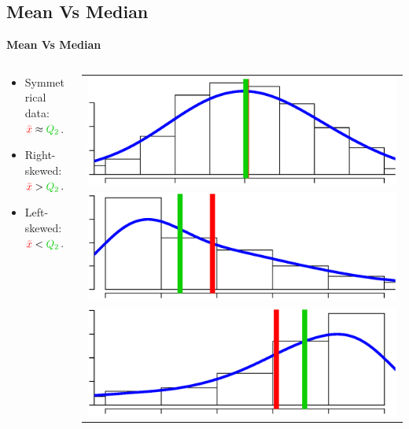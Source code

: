 \documentclass[compress]{beamer}        %
\makeatletter
\newcommand{\tcb}{\textcolor{beamer@blendedblue}}
\newcommand{\tcr}{\textcolor{red}}
\newcommand{\tcRg}{\textcolor{Rgreen}}
\makeatother
\begin{document}
\subsection{Mean Vs Median}
\begin{frame}{\bf \tcb{Mean Vs Median}\\[-1.3cm]}
\begin{columns}

\begin{column}{.5\textwidth}
\begin{adjustwidth}{-0.1cm}{0.0cm}
\begin{itemize}\itemsep2.3cm
\item Symmetrical data: $\tcr{\bar x} \approx \tcRg{Q_2}$.
\item Right-skewed: $\tcr{\bar x} > \tcRg{Q_2}$.
\item Left-skewed: $\tcr{\bar x} < \tcRg{Q_2}$.
\end{itemize}
\end{adjustwidth}
\end{column}

\begin{column}{.5\textwidth}
\begin{adjustwidth}{-0.3cm}{0.0cm}

\begin{tabular}{c}
\includegraphics[width=1\textwidth, trim = 0.0cm 0.5cm 0.3cm 1.5cm, clip]{Symmetrical2}\\
\includegraphics[width=1\textwidth, trim = 0.0cm 0.5cm 0.3cm 1.5cm, clip]{SkewRight2}\\
\includegraphics[width=1\textwidth, trim = 0.0cm 0.5cm 0.3cm 1.5cm, clip]{SkewLeft2}
\end{tabular}



\end{adjustwidth}
\end{column}
\end{columns}
\end{frame}
\end{document}
